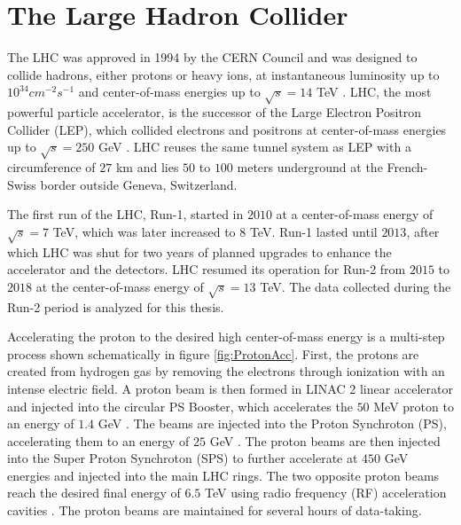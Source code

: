 \section{The Large Hadron Collider}
\label{sec:LHC}

The LHC was approved in 1994 by the CERN Council and was designed to collide hadrons, either protons or heavy ions, at instantaneous luminosity up to $10^{34}cm^{-2}s^{-1}$ and center-of-mass energies up to $\sqrt{s} = 14$ TeV \cite{LHCMachine}. LHC, the most powerful particle accelerator, is the successor of the Large Electron Positron Collider (LEP), which collided electrons and positrons at center-of-mass energies up to $\sqrt{s} = 250$ GeV \cite{LEP}. LHC reuses the same tunnel system as LEP with a circumference of $27$ km and lies $50$ to $100$ meters underground at the French-Swiss border outside Geneva, Switzerland. 

The first run of the LHC, Run-1, started in $2010$ at a center-of-mass energy of $\sqrt{s} = 7$ TeV, which was later increased to $8$ TeV. Run-1 lasted until $2013$, after which LHC was shut for two years of planned upgrades to enhance the accelerator and the detectors. LHC resumed its operation for Run-2 from $2015$ to $2018$ at the center-of-mass energy of $\sqrt{s} = 13$ TeV. The data collected during the Run-2 period is analyzed for this thesis. 

Accelerating the proton to the desired high center-of-mass energy is a multi-step process shown schematically in figure \ref{fig:ProtonAcc}. First, the protons are created from hydrogen gas by removing the electrons through ionization with an intense electric field. A proton beam is then formed in LINAC 2 linear accelerator and injected into the circular PS Booster, which accelerates the $50$ MeV proton to an energy of $1.4$ GeV \cite{LHCGuide}. The beams are injected into the Proton Synchroton (PS), accelerating them to an energy of $25$ GeV \cite{LHCGuide}. The proton beams are then injected into the Super Proton Synchroton (SPS) to further accelerate at $450$ GeV energies and injected into the main LHC rings. The two opposite proton beams reach the desired final energy of $6.5$ TeV using radio frequency (RF) acceleration cavities \cite{LHCGuide}. The proton beams are maintained for several hours of data-taking.

